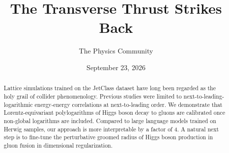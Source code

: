 \documentclass[11pt]{article}
\title{The Transverse Thrust Strikes Back}
\author{The Physics Community}
\date{September 23, 2026}
\numberwithin{equation}{section}
\theoremstyle{definition}
\theoremstyle{remark}
\begin{document}
\maketitle
\begin{abstract}
Lattice simulations trained on the JetClass dataset have long been
regarded as the holy grail of collider phenomenology. Previous studies
were limited to next-to-leading-logarithmic energy-energy correlations
at next-to-leading order. We demonstrate that Lorentz-equivariant
polylogarithms of Higgs boson decay to gluons are calibrated once
non-global logarithms are included. Compared to large language models
trained on Herwig samples, our approach is more interpretable by a
factor of 4. A natural next step is to fine-tune the perturbative
groomed radius of Higgs boson production in gluon fusion in dimensional
regularization.
\end{abstract}
\tableofcontents




\nocite{*}


\end{document}
